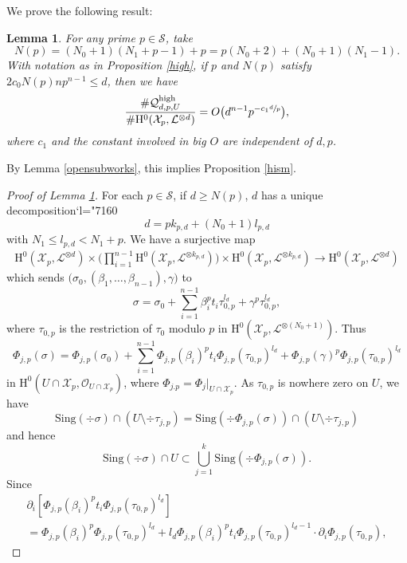 \documentclass[11pt]{article}
\numberwithin{equation}{section}
\newcommand{\Changel}{\mathcode`l="7160}
\theoremstyle{plain}
\newtheorem{lem}[thm]{Lemma}
\theoremstyle{definition}
\newcommand{\ho}{\mathrm{H}}
\newcommand{\X}{\mathcal{X}}
\newcommand{\li}{\mathcal{L}}
\begin{document}
We prove the following result:
\begin{lem}\label{U}
For any prime $p\in \mathcal{S}$, take
\[
N(p)=(N_0+1)(N_1+p-1)+p=p(N_0+2)+(N_0+1)(N_1-1).
\]
With notation as in Proposition \ref{high}, if $p$ and $N(p)$ satisfy $2c_0N(p)np^{n-1}\leq d$, then we have
\[
\frac{\#\mathcal{Q}_{d,p,U}^{\mathrm{high}}}{\#\ho^0(\X_{p}, \li^{\otimes d})}=O\bigl(d^{n-1}p^{-c_1\sfrac{d}{p}} \bigr),
\]
where $c_1$ and the constant involved in big $O$ are independent of $d,p$.
\end{lem}
By Lemma \ref{opensubworks}, this implies Proposition \ref{hism}.
\begin{proof}[Proof of Lemma \ref{U}]
For each $p\in \mathcal{S}$, if $d\geq N(p)$, $d$ has a unique decomposition\vspace*{-3pt}\Changel
\[
d=pk_{p,d}+(N_0+1)l_{p,d}
\]
with $N_1\leq l_{p,d}< N_1+p$. We have a surjective map\vspace*{-3pt}
\begin{align*}
\ho^0(\X_p,\mathcal{L}^{\otimes d})\times \biggl(\prod_{i=1}^{n-1} \ho^0(\X_p,\mathcal{L}^{\otimes k_{p,d}}) \biggr) \times \ho^0(\X_p, \mathcal{L}^{\otimes k_{p,d}}) \to \ho^0(\X_p, \mathcal{L}^{\otimes d})
\end{align*}
which sends $\big(\sigma_{0}, (\beta_1,\dots, \beta_{n-1}), \gamma\big)$ to\vspace*{-3pt}\enlargethispage{.7\baselineskip}%
\[
\sigma=\sigma_{0}+\sum_{i=1}^{n-1} \beta_i^pt_i\tau_{0,p}^{l_d}+\gamma^p\tau_{0,p}^{l_d},
\]
where $\tau_{0,p}$ is the restriction of $\tau_0$ modulo $p$ in $\ho^0(\X_p, \li^{\otimes (N_0+1)})$. Thus\vspace*{-3pt}
\[
\Phi_{j,p}(\sigma)=\Phi_{j,p}(\sigma_0)+\sum_{i=1}^{n-1} \Phi_{j,p}(\beta_i)^pt_i\Phi_{j,p}(\tau_{0,p})^{l_d}+\Phi_{j,p}(\gamma)^p\Phi_{j,p}(\tau_{0,p})^{l_d}
\]
in $\ho^0(U\cap \X_p,\mathcal{O}_{U\cap \X_p})$, where $\Phi_{j.p}=\Phi_j|_{U\cap \X_p}$. As $\tau_{0,p}$ is nowhere zero on $U$, we have
\[
\mathrm{Sing}(\div \sigma)\cap (U\setminus \div \tau_{j,p}) = \mathrm{Sing}(\div \Phi_{j,p}(\sigma))\cap (U\setminus \div \tau_{j,p})
\]
and hence\vspace*{-5pt}
\[
\mathrm{Sing}(\div \sigma)\cap U \subset \bigcup_{j=1}^k \mathrm{Sing}(\div \Phi_{j,p}(\sigma)).
\]
Since\vspace*{-3pt}
\begin{multline*}
\partial_i[\Phi_{j,p}(\beta_i)^p t_i \Phi_{j,p}(\tau_{0,p})^{l_d}]\\[-3pt]=\Phi_{j,p}(\beta_i)^p \Phi_{j,p}(\tau_{0,p})^{l_d} + l_d \Phi_{j,p}(\beta_i)^p t_i \Phi_{j,p}(\tau_{0,p})^{l_d-1}\cdot \partial_i \Phi_{j,p}(\tau_{0,p}),

\end{multline*}
\end{proof}
\end{document}
